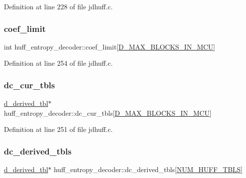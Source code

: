 Definition at line 228 of file jdhuff.\+c.

\mbox{\label{structhuff__entropy__decoder_a28830ac6bc49fafca8325b1ec0472a33}} 
\subsubsection{\texorpdfstring{coef\_limit}{coef\_limit}}
{\footnotesize\ttfamily int huff\+\_\+entropy\+\_\+decoder\+::coef\+\_\+limit\mbox{[}\mbox{\hyperlink{jpeglib_8h_af974a668decc270fb4d00587618dd110}{D\+\_\+\+M\+A\+X\+\_\+\+B\+L\+O\+C\+K\+S\+\_\+\+I\+N\+\_\+\+M\+CU}}\mbox{]}}



Definition at line 254 of file jdhuff.\+c.

\mbox{\label{structhuff__entropy__decoder_a63725587525df86501d2a632152c01c0}} 
\subsubsection{\texorpdfstring{dc\_cur\_tbls}{dc\_cur\_tbls}}
{\footnotesize\ttfamily \mbox{\hyperlink{structd__derived__tbl}{d\+\_\+derived\+\_\+tbl}}$\ast$ huff\+\_\+entropy\+\_\+decoder\+::dc\+\_\+cur\+\_\+tbls\mbox{[}\mbox{\hyperlink{jpeglib_8h_af974a668decc270fb4d00587618dd110}{D\+\_\+\+M\+A\+X\+\_\+\+B\+L\+O\+C\+K\+S\+\_\+\+I\+N\+\_\+\+M\+CU}}\mbox{]}}



Definition at line 251 of file jdhuff.\+c.

\mbox{\label{structhuff__entropy__decoder_a277328a6f93b55616bd86b0056098c65}} 
\subsubsection{\texorpdfstring{dc\_derived\_tbls}{dc\_derived\_tbls}}
{\footnotesize\ttfamily \mbox{\hyperlink{structd__derived__tbl}{d\+\_\+derived\+\_\+tbl}}$\ast$ huff\+\_\+entropy\+\_\+decoder\+::dc\+\_\+derived\+\_\+tbls\mbox{[}\mbox{\hyperlink{jpeglib_8h_a6b12985705944e0623b671f29dc5722e}{N\+U\+M\+\_\+\+H\+U\+F\+F\+\_\+\+T\+B\+LS}}\mbox{]}}




